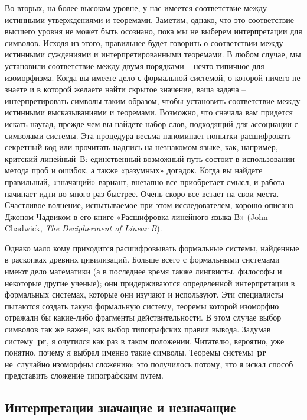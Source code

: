 \documentclass[../main.tex]{subfiles}
\begin{document}
Во-вторых, на более высоком уровне, у нас имеется соответствие между истинными утверждениями и теоремами.
Заметим, однако, что это соответствие высшего уровня не может быть осознано, пока мы не выберем интерпретации для символов.
Исходя из этого, правильнее будет говорить о соответствии между истинными суждениями и интерпретированными теоремами.
В любом случае, мы установили соответствие между двумя порядками \--- нечто типичное для изоморфизма.
Когда вы имеете дело с формальной системой, о которой ничего не знаете и в которой желаете найти скрытое значение, ваша задача \--- интерпретировать символы таким образом, чтобы установить соответствие между истинными высказываниями и теоремами.
Возможно, что сначала вам придется искать наугад, прежде чем вы найдете набор слов, подходящий для ассоциации с символами системы.
Эта процедура весьма напоминает попытки расшифровать секретный код или прочитать надпись на незнакомом языке, как, например, критский линейный~В: единственный возможный путь состоит в использовании метода проб и ошибок, а также «разумных» догадок.
Когда вы найдете правильный, «значащий» вариант, внезапно все приобретает смысл, и работа начинает идти во много раз быстрее.
Очень скоро все встает на свои места.
Счастливое волнение, испытываемое при этом исследователем, хорошо описано Джоном Чадвиком в его книге «Расшифровка линейного языка В» (John Chadwick, \textit{The Decipherment of Linear B}).

Однако мало кому приходится расшифровывать формальные системы, найденные в раскопках древних цивилизаций.
Больше всего с формальными системами имеют дело математики (а в последнее время также лингвисты, философы и некоторые другие ученые); они придерживаются определенной интерпретации в формальных системах, которые они изучают и используют.
Эти специалисты пытаются создать такую формальную систему, теоремы которой изоморфно отражали бы какие-либо фрагменты действительности.
В этом случае выбор символов так же важен, как выбор типографских правил вывода.
Задумав систему~\textbf{pr}, я очутился как раз в таком положении.
Читателю, вероятно, уже понятно, почему я выбрал именно такие символы.
Теоремы системы~\textbf{pr} не~случайно изоморфны сложению; это получилось потому, что я искал способ представить сложение типографским путем.


\subsection{Интерпретации значащие и незначащие}
\end{document}
